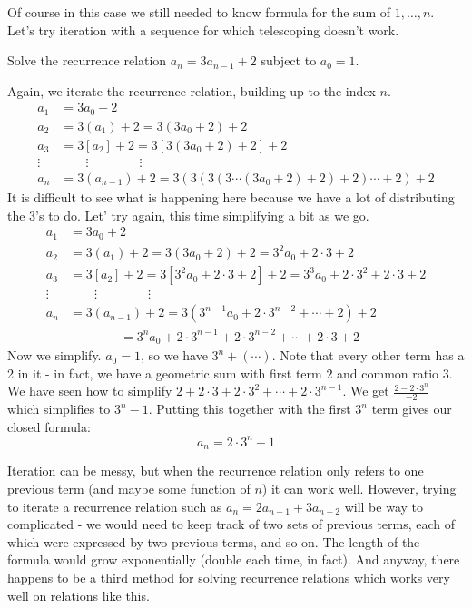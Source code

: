 \documentclass[12pt]{article}
\begin{document}
 Of course in this case we still needed to know formula for the sum of $1,\ldots,n$.  Let's try iteration with a sequence for which telescoping doesn't work.
 
 \begin{example}
   Solve the recurrence relation $a_n = 3a_{n-1} + 2$ subject to $a_0 = 1$.
   \begin{solution}
     Again, we iterate the recurrence relation, building up to the index $n$.
     \begin{align*}
      a_1 &= 3a_0 + 2\\
      a_2 &= 3(a_1) + 2 = 3(3a_0 + 2) + 2\\
      a_3 &= 3[a_2] + 2 = 3[3(3a_0 + 2) + 2] + 2\\
      \vdots & \qquad \vdots \qquad \qquad \vdots \\
      a_n &= 3(a_{n-1}) + 2 = 3(3(3(3\cdots(3a_0 + 2) + 2) + 2)\cdots + 2)+ 2
     \end{align*}
	 It is difficult to see what is happening here because we have a lot of distributing the 3's to do.  Let' try again, this time simplifying a bit as we go.
	      \begin{align*}
      a_1 &= 3a_0 + 2\\
      a_2 &= 3(a_1) + 2 = 3(3a_0 + 2) + 2 = 3^2a_0 + 2\cdot 3 + 2\\
      a_3 &= 3[a_2] + 2 = 3[3^2a_0 + 2\cdot 3 + 2] + 2 = 3^3 a_0 + 2 \cdot 3^2 + 2 \cdot 3 + 2\\
      \vdots & \qquad \vdots \qquad \qquad \vdots \\
      a_n &= 3(a_{n-1}) + 2 = 3(3^{n-1}a_0 + 2 \cdot 3^{n-2} + \cdots +2)+ 2\\
      & \qquad \qquad = 3^n a_0 + 2\cdot 3^{n-1} + 2 \cdot 3^{n-2} + \cdots + 2\cdot 3 + 2
     \end{align*}
    Now we simplify.  $a_0 = 1$, so we have $3^n + (\cdots)$.  Note that every other term has a 2 in it - in fact, we have a geometric sum with first term $2$ and common ratio $3$.  We have seen how to simplify $2 + 2\cdot 3 + 2 \cdot 3^2 + \cdots + 2\cdot 3^{n-1}$.  We get $\frac{2-2\cdot 3^n}{-2}$ which simplifies to $3^n - 1$.  Putting this together with the first $3^n$ term gives our closed formula:
    \[a_n = 2\cdot 3^n - 1\]
   \end{solution}
 \end{example}


 Iteration can be messy, but when the recurrence relation only refers to one previous term (and maybe some function of $n$) it can work well.  However, trying to iterate a recurrence relation such as $a_n = 2 a_{n-1} + 3 a_{n-2}$ will be way to complicated - we would need to keep track of two sets of previous terms, each of which were expressed by two previous terms, and so on.  The length of the formula would grow exponentially (double each time, in fact).  And anyway, there happens to be a third method for solving recurrence relations which works very well on relations like this.
\end{document}
